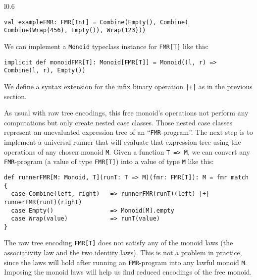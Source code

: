 \begin{wrapfigure}{l}{0.6\columnwidth}%
\vspace{-0.4\baselineskip}
\begin{lstlisting}
val exampleFMR: FMR[Int] = Combine(Empty(), Combine( Combine(Wrap(456), Empty()), Wrap(123)))
\end{lstlisting}
\vspace{0.2\baselineskip}
\end{wrapfigure}%

\noindent {\tiny{}\hspace{0.1\columnwidth}}{\tiny{} \Tree[ [ $e$ ] [ [ [ $456$ ] [ $e$ ] ] [ $123$ ] ] ] }{\tiny\par}

We can implement a \lstinline!Monoid!
typeclass instance for \lstinline!FMR[T]!
like this:
\begin{lstlisting}
implicit def monoidFMR[T]: Monoid[FMR[T]] = Monoid((l, r) => Combine(l, r), Empty())
\end{lstlisting}
We define a syntax extension for the infix binary operation \lstinline!|+|!
as in the previous section.

As usual with raw tree encodings, this free monoid\textsf{'}s operations not
perform any computations but only create nested case classes. Those
nested case classes represent an unevaluated expression tree of an
\textsf{``}\lstinline!FMR!-program\textsf{''}.
The next step is to implement a universal runner that will evaluate
that expression tree using the operations of any chosen monoid \lstinline!M!.
Given a function \lstinline!T => M!,
we can convert any \lstinline!FMR!-program
(a value of type \lstinline!FMR[T]!)
into a value of type \lstinline!M!
like this:
\begin{lstlisting}
def runnerFMR[M: Monoid, T](runT: T => M)(fmr: FMR[T]): M = fmr match {
  case Combine(left, right)   => runnerFMR(runT)(left) |+| runnerFMR(runT)(right)
  case Empty()                => Monoid[M].empty
  case Wrap(value)            => runT(value)
}
\end{lstlisting}
The raw tree encoding \lstinline!FMR[T]!
does not satisfy any of the monoid laws (the associativity law and
the two identity laws). This is not a problem in practice, since the
laws will hold after running an \lstinline!FMR!-program
into any lawful monoid \lstinline!M!.
Imposing the monoid laws will help us find reduced encodings of the
free monoid.

